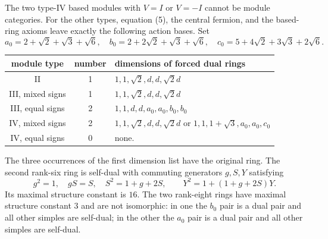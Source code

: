 \begin{theorem}
The two type-IV based modules with $V=I$ or $V=-I$ cannot be module
categories. For the other types, equation (5), the central fermion,
and the based-ring axioms leave exactly the following action bases.
Set
\[
a_0=2+\sqrt2+\sqrt3+\sqrt6,\quad
b_0=2+2\sqrt2+\sqrt3+\sqrt6,\quad
c_0=5+4\sqrt2+3\sqrt3+2\sqrt6.
\]
\begin{center}\begin{tabular}{c|c|l}
module type&number&dimensions of forced dual rings\\\hline
II&1&$1,1,\sqrt2,d,d,\sqrt2d$\\
III, mixed signs&1&$1,1,\sqrt2,d,d,\sqrt2d$\\
III, equal signs&2&$1,1,d,d,a_0,a_0,b_0,b_0$\\
IV, mixed signs&2&$1,1,\sqrt2,d,d,\sqrt2d$ or $1,1,1+\sqrt3,a_0,a_0,c_0$\\
IV, equal signs&0&none.
\end{tabular}\end{center}
The three occurrences of the first dimension list have the original
ring. The second rank-six ring is self-dual with commuting generators
$g,S,Y$ satisfying
\[
g^2=1,\quad gS=S,\quad S^2=1+g+2S,\qquad
Y^2=1+(1+g+2S)Y.
\]
Its maximal structure constant is $16$.
The two rank-eight rings have maximal structure constant $3$ and are
not isomorphic: in one the $b_0$ pair is a dual pair and all other simples
are self-dual; in the other the $a_0$ pair is a dual pair and all other
simples are self-dual.
\end{theorem}
